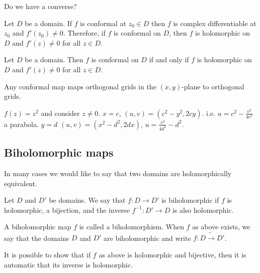 \documentclass[10pt, a4paper]{article}
\begin{document}
Do we have a converse?

\begin{proposition}
    Let $D$ be a domain.
    If $f$ is conformal at $z_0 \in D$ then $f$ is complex differentiable at $z_0$ and $f'(z_0) \neq 0$.
    Therefore,
    if $f$ is conformal on $D$,
    then $f$ is holomorphic on $D$ and $f'(z) \neq 0$ for all $z \in D$.
\end{proposition}

\begin{corollary}
    Let $D$ be a domain.
    Then $f$ is conformal on $D$ if and only if $f$ is holomorphic on $D$ and $f'(z) \neq 0$ for all $z \in D$.
\end{corollary}

\begin{corollary}
    Any conformal map maps orthogonal grids in the $(x, y)$-plane to orthogonal grids.
\end{corollary}

\begin{example}
    $f(z) = z ^ 2$ and consider $z \neq 0$.
    $x = c$,
    $(u, v) = (c ^ 2 - y ^ 2, 2cy)$.
    i.e. $u = c ^ 2 - \frac{v ^ 2}{4c ^ 2}$ a parabola.
    $y = d$
    $(u, v) = (x ^ 2 - d ^ 2, 2dx)$,
    $u = \frac{v ^ 2}{4d ^ 2} - d ^ 2$.
\end{example}

\newpage

\subsection{Biholomorphic maps}
In many cases we would like to say that two domains are holomorphically equivalent.

\begin{definition}
    Let $D$ and $D'$ be domains.
    We say that $f : D \to D'$ is biholomorphic if $f$ is holomorphic,
    a bijection,
    and the inverse $f ^ {-1} : D' \to D$ is also holomorphic.

    A biholomorphic map $f$ is called a biholomorphism.
    When $f$ as above exists,
    we say that the domains $D$ and $D'$ are biholomorphic and write $f : D \tilde{\to} D'$.
\end{definition}

\begin{remark}
    It is possible to show that if $f$ as above is holomorphic and bijective,
    then it is automatic that its inverse is holomorphic.
\end{remark}
\end{document}
